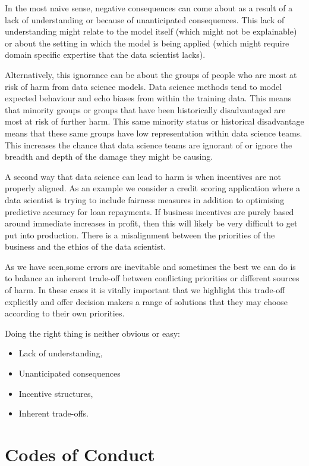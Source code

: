 \documentclass[
  letterpaper,
  DIV=11,
  numbers=noendperiod]{scrreprt}
\begin{document}
In the most naive sense, negative consequences can come about as a
result of a lack of understanding or because of unanticipated
consequences. This lack of understanding might relate to the model
itself (which might not be explainable) or about the setting in which
the model is being applied (which might require domain specific
expertise that the data scientist lacks).

Alternatively, this ignorance can be about the groups of people who are
most at risk of harm from data science models. Data science methods tend
to model expected behaviour and echo biases from within the training
data. This means that minority groups or groups that have been
historically disadvantaged are most at risk of further harm. This same
minority status or historical disadvantage means that these same groups
have low representation within data science teams. This increases the
chance that data science teams are ignorant of or ignore the breadth and
depth of the damage they might be causing.

A second way that data science can lead to harm is when incentives are
not properly aligned. As an example we consider a credit scoring
application where a data scientist is trying to include fairness
measures in addition to optimising predictive accuracy for loan
repayments. If business incentives are purely based around immediate
increases in profit, then this will likely be very difficult to get put
into production. There is a misalignment between the priorities of the
business and the ethics of the data scientist.

As we have seen,some errors are inevitable and sometimes the best we can
do is to balance an inherent trade-off between conflicting priorities or
different sources of harm. In these cases it is vitally important that
we highlight this trade-off explicitly and offer decision makers a range
of solutions that they may choose according to their own priorities.

Doing the right thing is neither obvious or easy:

\begin{itemize}
\item
  Lack of understanding,
\item
  Unanticipated consequences
\item
  Incentive structures,
\item
  Inherent trade-offs.
\end{itemize}

\section{Codes of Conduct}\label{codes-of-conduct}
\end{document}
